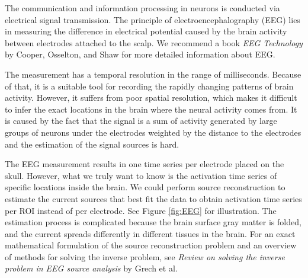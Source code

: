 The communication and information processing in neurons is conducted via electrical signal transmission. The principle of electroencephalography (EEG) lies in measuring the difference in electrical potential caused by the brain activity between electrodes attached to the scalp. \cite{howseman_electroencephalographic_1999, st_louis_electroencephalography_2016, cooper_eeg_1974} We recommend a book \textit{EEG Technology} by Cooper, Osselton, and Shaw for more detailed information about EEG. \cite{cooper_eeg_1974}

The measurement has a temporal resolution in the range of milliseconds. Because of that, it is a suitable tool for recording the rapidly changing patterns of brain activity. However, it suffers from poor spatial resolution, which makes it difficult to infer the exact locations in the brain where the neural activity comes from. It is caused by the fact that the signal is a sum of activity generated by large groups of neurons under the electrodes weighted by the distance to the electrodes and the estimation of the signal sources is hard. \cite{howseman_electroencephalographic_1999, st_louis_electroencephalography_2016,michel_eeg_2019}

The EEG measurement results in one time series per electrode placed on the skull. However, what we truly want to know is the activation time series of specific locations inside the brain. We could perform source reconstruction to estimate the current sources that best fit the data to obtain activation time series per ROI instead of per electrode. See Figure \ref{fig:EEG} for illustration. The estimation process is complicated because the brain surface gray matter is folded, and the current spreads differently in different tissues in the brain. For an exact mathematical formulation of the source reconstruction problem and an overview of methods for solving the inverse problem, see \textit{Review on solving the inverse problem in EEG source analysis} by Grech et al. \cite{grech_review_2008}

